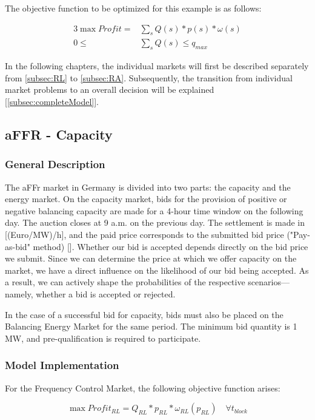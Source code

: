 The objective function to be optimized for this example is as follows:

\begin{alignat}{3}
	\max Profit = & \sum_{s} Q(s) * p(s) * \omega(s) \\
	0 \leq        & \sum_{s} Q(s) \leq q_{max}
\end{alignat}

In the following chapters, the individual markets will first be described separately from \autoref{subsec:RL} to \autoref{subsec:RA}.
Subsequently, the transition from individual market problems to an overall decision will be explained [\autoref{subsec:completeModel}].

\subsection{aFFR - Capacity}
\label{subsec:RL}

\subsubsection{General Description}
The aFFr market in Germany is divided into two parts: the capacity and the energy market.
On the capacity market, bids for the provision of positive or negative balancing capacity are made for a 4-hour time window on the following day.
The auction closes at 9 a.m. on the previous day.
The settlement is made in [(Euro/MW)/h], and the paid price corresponds to the submitted bid price ("Pay-as-bid" method) [\cite{.04.12.2024}].
Whether our bid is accepted depends directly on the bid price we submit.
Since we can determine the price at which we offer capacity on the market,
we have a direct influence on the likelihood of our bid being accepted.
As a result, we can actively shape the probabilities of the respective scenarios—namely,
whether a bid is accepted or rejected.

In the case of a successful bid for capacity, bids must also be placed on the Balancing Energy Market for the same period.
The minimum bid quantity is 1 MW, and pre-qualification is required to participate.

\subsubsection{Model Implementation}
For the Frequency Control Market, the following objective function arises:

\begin{equation}
	\max Profit_{RL} = Q_{RL} * p_{RL} * \omega_{RL}(p_{RL}) \quad \forall t_{block}
\end{equation}

